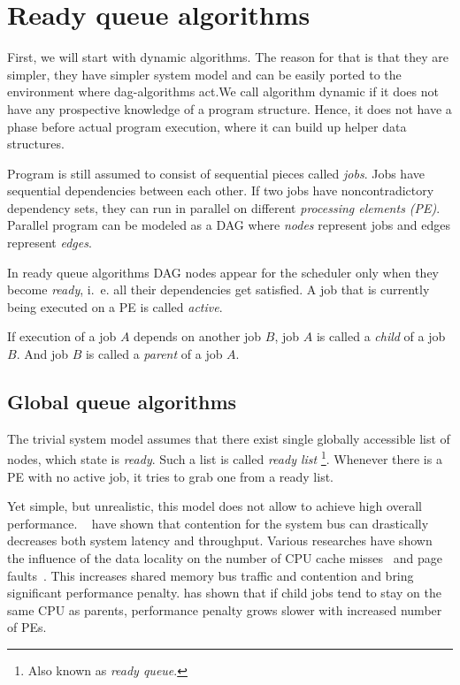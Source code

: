 \section{Ready queue algorithms}

First, we will start with dynamic algorithms. The reason for that is
that they are simpler, they have simpler system model and can be
easily ported to the environment where dag-algorithms act.We call
algorithm dynamic if it does not have any prospective knowledge of a
program structure. Hence, it does not have a phase before actual
program execution, where it can build up helper data structures.

Program is still assumed to consist of sequential pieces called
\emph{jobs}. Jobs have sequential dependencies between each other. If
two jobs have noncontradictory dependency sets, they can run in
parallel on different \emph{processing elements (PE)}.  Parallel
program can be modeled as a DAG where \emph{nodes} represent jobs and
edges represent \emph{edges}.

In ready queue algorithms DAG nodes appear for the scheduler only when
they become \emph{ready}, i.~e. all their dependencies get
satisfied. A job that is currently being executed on a PE is called
\emph{active}.

\begin{definition}
  If execution of a job $A$ depends on another job $B$, job $A$ is
  called a \emph{child} of a job $B$. And job $B$ is called a
  \emph{parent} of a job $A$.
\end{definition}

\subsection{Global queue algorithms}
\label{sec:global_queue}

The trivial system model assumes that there exist single globally
accessible list of nodes, which state is \emph{ready}. Such a list is
called \emph{ready list} \footnote{Also known as \emph{ready
    queue}.}. Whenever there is a PE with no active job, it tries to
grab one from a ready list.

Yet simple, but unrealistic, this model does not allow to achieve high
overall
performance. \citeauthor{anderson1989performance}~\cite{anderson1989performance}
have  shown that contention for the
system bus can drastically decreases both system latency and
throughput. Various researches have shown the influence of the data
locality on the number of CPU cache
misses~\cite{Spoonhower:2009:BNP:1583991.1584019,Herlihy:2014:WFC:2555243.2555257,Squillante1993}
and page faults~\cite{Blumofe:1996:ADD:237502.237574}. This increases
shared memory bus traffic and contention and bring significant
performance penalty. \cite{Squillante1993} has shown that if child
jobs tend to stay on the same CPU as parents, performance penalty
grows slower with increased number of PEs.

